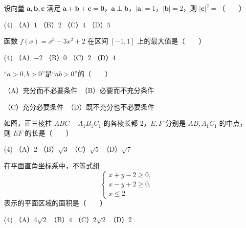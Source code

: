 \begin{question}
设向量 $\boldsymbol a,\boldsymbol b,\boldsymbol c$ 满足 $\boldsymbol a+\boldsymbol b+\boldsymbol c=\boldsymbol 0$，$\boldsymbol a\perp\boldsymbol b$，$|\boldsymbol a|=1$，$|\boldsymbol b|=2$，则 $|\boldsymbol c|^2=$\mbox{（　　）}

\begin{gkopts}(4)
\task （A）$1$
\task （B）$2$
\task （C）$4$
\task （D）$5$
\end{gkopts}

\end{question}
\begin{question}
函数 $f(x)=x^3-3x^2+2$ 在区间 $[-1,1]$ 上的最大值是\mbox{（　　）}

\begin{gkopts}(4)
\task （A）$-2$
\task （B）$0$
\task （C）$2$
\task （D）$4$
\end{gkopts}

\end{question}
\begin{question}
“$a>0,b>0$”是“$ab>0$”的\mbox{（　　）}

（A）充分而不必要条件　（B）必要而不充分条件

（C）充分必要条件　（D）既不充分也不必要条件

\Needspace{0.4\textheight}
\end{question}
\begin{question}
如图，正三棱柱 $ABC-A_1B_1C_1$ 的各棱长都 $2$，$E,F$ 分别是 $AB,A_1C_1$ 的中点，则 $EF$ 的长是\mbox{（　　）}
\nopagebreak[4]
\begin{center}\end{center}
\nopagebreak[4]
\begin{gkopts}(4)
\task （A）$2$
\task （B）$\sqrt3$
\task （C）$\sqrt5$
\task （D）$\sqrt7$
\end{gkopts}

\end{question}
\begin{question}
在平面直角坐标系中，不等式组
\nopagebreak[4]
\[
\begin{cases}
x+y-2\geqslant 0,\\
x-y+2\geqslant 0,\\
x\leqslant 2
\end{cases}
\]
表示的平面区域的面积是\mbox{（　　）}

\begin{gkopts}(4)
\task （A）$4\sqrt2$
\task （B）$4$
\task （C）$2\sqrt2$
\task （D）$2$
\end{gkopts}

\end{question}
